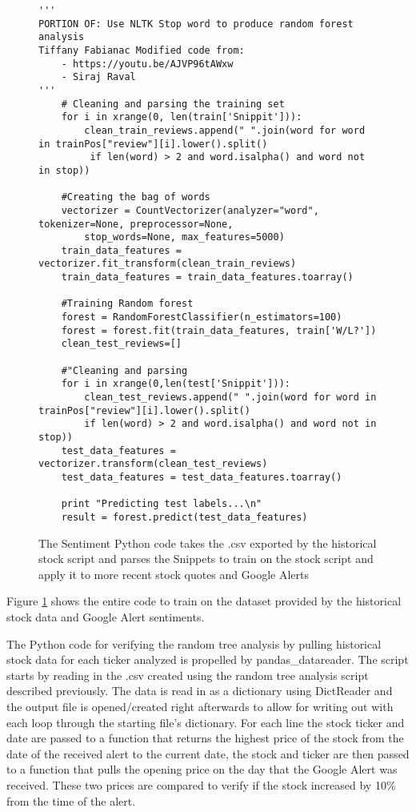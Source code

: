 \documentclass[sigconf]{acmart}
\begin{document}
\begin{figure}[htb]
\begin{verbatim}
'''
PORTION OF: Use NLTK Stop word to produce random forest analysis 
Tiffany Fabianac Modified code from:
    - https://youtu.be/AJVP96tAWxw
    - Siraj Raval
'''
    # Cleaning and parsing the training set
    for i in xrange(0, len(train['Snippit'])):
        clean_train_reviews.append(" ".join(word for word in trainPos["review"][i].lower().split()
		 if len(word) > 2 and word.isalpha() and word not in stop))

    #Creating the bag of words
    vectorizer = CountVectorizer(analyzer="word", tokenizer=None, preprocessor=None, 
		stop_words=None, max_features=5000)
    train_data_features = vectorizer.fit_transform(clean_train_reviews)
    train_data_features = train_data_features.toarray()

    #Training Random forest
    forest = RandomForestClassifier(n_estimators=100)
    forest = forest.fit(train_data_features, train['W/L?'])
    clean_test_reviews=[]

    #"Cleaning and parsing
    for i in xrange(0,len(test['Snippit'])):
        clean_test_reviews.append(" ".join(word for word in trainPos["review"][i].lower().split() 
		if len(word) > 2 and word.isalpha() and word not in stop))
    test_data_features = vectorizer.transform(clean_test_reviews)
    test_data_features = test_data_features.toarray()

    print "Predicting test labels...\n"
    result = forest.predict(test_data_features)
\end{verbatim}
\caption{The Sentiment Python code takes the .csv exported by the historical stock script and parses the Snippets to train on the stock script and apply it to more recent stock quotes and Google Alerts}\label{c:sentiment}
\end{figure}

Figure \ref{c:sentiment} shows the entire code to train on the dataset provided by the historical stock data and Google Alert sentiments.

The Python code for verifying the random tree analysis by pulling historical stock data for each ticker analyzed is propelled by pandas\_datareader. The script starts by reading in the .csv created using the random tree analysis script described previously. The data is read in as a dictionary using DictReader and the output file is opened/created right afterwards to allow for writing out with each loop through the starting file's dictionary. For each line the stock ticker and date are passed to a function that returns the highest price of the stock from the date of the received alert to the current date, the stock and ticker are then passed to a function that pulls the opening price on the day that the Google Alert was received. These two prices are compared to verify if the stock increased by 10\% from the time of the alert. 
\end{document}
